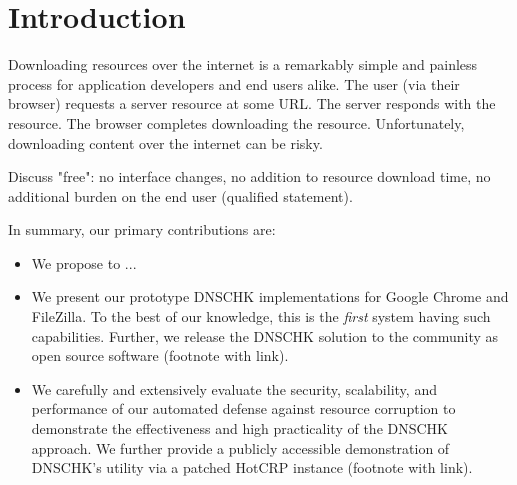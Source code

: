 \section{Introduction} \label{sec:introduction}

Downloading resources over the internet is a remarkably simple and painless
process for application developers and end users alike. The user (via their
browser) requests a server resource at some URL. The server responds with the
resource. The browser completes downloading the resource. Unfortunately,
downloading content over the internet can be risky.


Discuss "free": no interface changes, no addition to resource download time, no
additional burden on the end user (qualified statement).

\cite{DNSSEC}

In summary, our primary contributions are:

\begin{itemize}

  \item We propose to  ...

  \item We present our prototype DNSCHK implementations for Google Chrome and
  FileZilla. To the best of our knowledge, this is the \emph{first} system
  having such capabilities. Further, we release the DNSCHK solution to the
  community as open source software (footnote with link).

  \item We carefully and extensively evaluate the security, scalability, and
  performance of our automated defense against resource corruption to
  demonstrate the effectiveness and high practicality of the DNSCHK approach. We
  further provide a publicly accessible demonstration of DNSCHK's utility via a
  patched HotCRP instance (footnote with link).

\end{itemize}
